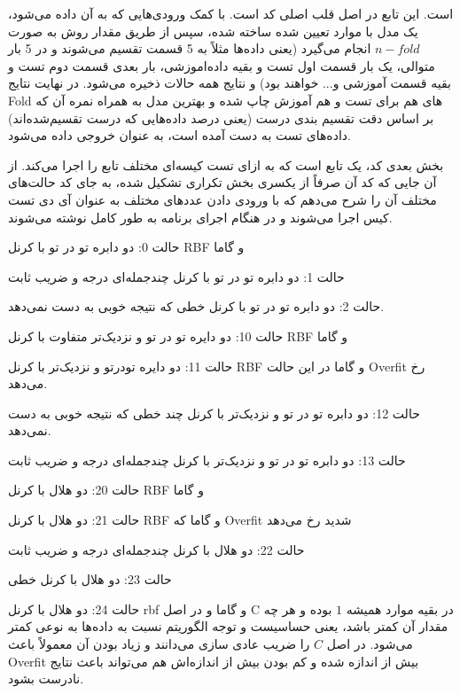 \documentclass[12pt,titlepage,a4page , tikz , multi,table , svgnames,xcdraw]{article}
\begin{document}
است. این تابع در اصل قلب اصلی کد است. با کمک ورودی‌هایی که به آن داده می‌شود، یک مدل  با موارد تعیین شده ساخته شده، سپس از طریق مقدار  روش  به صورت $n-fold$ انجام می‌گیرد (یعنی داده‌ها مثلاً به 5 قسمت تقسیم می‌شوند و در 5 بار متوالی، یک بار قسمت اول تست و بقیه داده‌اموزشی، بار بعدی قسمت دوم تست و بقیه قسمت آموزشی و... خواهند بود) و نتایج همه حالات ذخیره می‌شود. در نهایت نتایج Fold های هم برای  تست و هم آموزش چاپ شده و بهترین مدل به همراه نمره آن که بر اساس دقت تقسیم بندی درست (یعنی درصد داده‌هایی که درست تقسیم‌شده‌اند) داده‌های تست به دست آمده است،  به عنوان خروجی داده می‌شود. 

بخش بعدی کد، یک تابع است که به ازای تست کیسه‌ای مختلف تابع را اجرا می‌کند. از آن جایی که کد آن صرفاً از یکسری بخش تکراری تشکیل شده، به جای کد حالت‌های مختلف آن را شرح می‌دهم که با ورودی دادن عددهای مختلف به عنوان آی دی تست کیس اجرا می‌شوند و در هنگام اجرای برنامه به طور کامل نوشته می‌شوند.

حالت 0: دو دابره تو در تو با کرنل RBF و گاما 

حالت 1: دو دابره تو در تو با کرنل چندجمله‌ای درجه  و ضریب ثابت 

حالت 2: دو دابره تو در تو با کرنل خطی که نتیجه خوبی به دست نمی‌دهد.

حالت 10: دو دایره تو در تو و نزدیک‌تر متفاوت با کرنل RBF و گاما 

حالت 11: دو دایره تودرتو  و نزدیک‌تر با کرنل RBF و گاما  در این حالت Overfit رخ می‌دهد.

حالت 12: دو دابره تو در تو و نزدیک‌تر با کرنل چند خطی که نتیجه خوبی به دست نمی‌دهد.

حالت 13: دو دابره تو در تو و نزدیک‌تر با کرنل چندجمله‌ای درجه  و ضریب ثابت 

حالت 20: دو هلال با کرنل RBF و گاما 

حالت 21: دو هلال با کرنل RBF و گاما  که Overfit شدید رخ می‌دهد

حالت 22: دو هلال با کرنل چندجمله‌ای درجه  و ضریب ثابت 

حالت 23: دو هلال با کرنل خطی

حالت 24: دو هلال با کرنل rbf و گاما  و  در اصل C در بقیه موارد همیشه $1$ بوده و هر چه مقدار آن کمتر باشد، یعنی حساسیست و توجه الگوریتم نسبت به داده‌ها به نوعی کمتر می‌شود. در اصل $C$ را ضریب عادی سازی می‌دانند و زیاد بودن آن معمولاً باعث Overfit بیش از اندازه شده و کم بودن بیش از اندازه‌اش هم می‌تواند باعث نتایج نادرست بشود.
\end{document}
